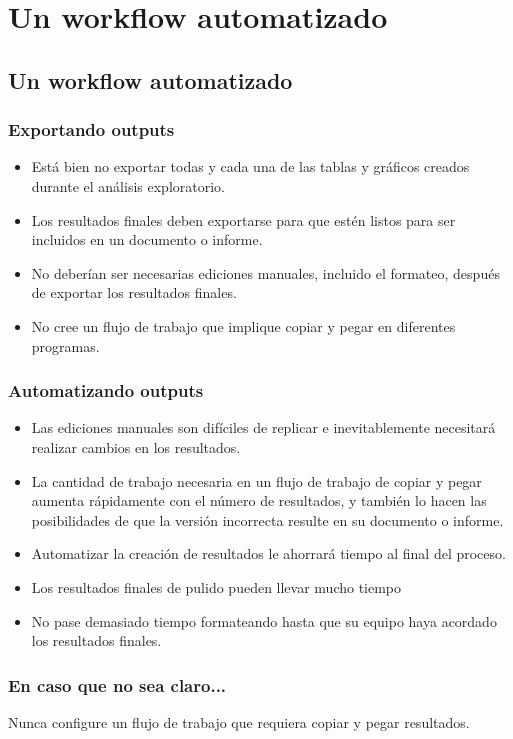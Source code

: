 \documentclass[10pt, aspectratio=169, compress]{beamer}
\begin{document}
\section{Un workflow automatizado}
\subsection{Un workflow automatizado}
\begin{frame}
	\frametitle{Exportando outputs}
	\begin{itemize}
		\item Está bien no exportar todas y cada una de las tablas y gráficos creados durante el análisis exploratorio.
		\item Los resultados finales deben exportarse para que estén listos para ser incluidos en un documento o informe.
		\item No deberían ser necesarias ediciones manuales, incluido el formateo, después de exportar los resultados finales.
		\item No cree un flujo de trabajo que implique copiar y pegar en diferentes programas.
	\end{itemize}
\end{frame}
\begin{frame}
	\frametitle{Automatizando outputs}
	\begin{itemize}
		\item Las ediciones manuales son difíciles de replicar e inevitablemente necesitará realizar cambios en los resultados.
		\item La cantidad de trabajo necesaria en un flujo de trabajo de copiar y pegar aumenta rápidamente con el número de resultados, y también lo hacen las posibilidades de que la versión incorrecta resulte en su documento o informe.
		\item Automatizar la creación de resultados le ahorrará tiempo al final del proceso.
		\item Los resultados finales de pulido pueden llevar mucho tiempo
		\item No pase demasiado tiempo formateando hasta que su equipo haya acordado los resultados finales.
	\end{itemize}
\end{frame}
\begin{frame}
	\frametitle{En caso que no sea claro...}
	
	\begin{center}
		{\LARGE 
		Nunca configure un flujo de trabajo que requiera copiar y pegar resultados.
		}
	\end{center}
\end{frame}
\end{document}
